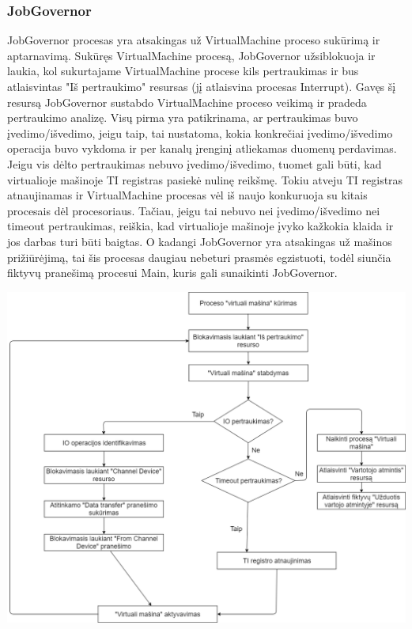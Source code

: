 \documentclass{scrartcl}
\begin{document}
      \subsubsection{JobGovernor}
        JobGovernor procesas yra atsakingas už VirtualMachine proceso sukūrimą ir aptarnavimą. Sukūręs VirtualMachine procesą, JobGovernor užsiblokuoja ir laukia, kol sukurtajame VirtualMachine procese kils pertraukimas ir bus atlaisvintas "Iš pertraukimo" resursas (jį atlaisvina procesas Interrupt). Gavęs šį resursą JobGovernor sustabdo VirtualMachine proceso veikimą ir pradeda pertraukimo analizę. Visų pirma yra patikrinama, ar pertraukimas buvo įvedimo/išvedimo, jeigu taip, tai nustatoma, kokia konkrečiai įvedimo/išvedimo operacija buvo vykdoma ir per kanalų įrenginį atliekamas duomenų perdavimas. Jeigu vis dėlto pertraukimas nebuvo įvedimo/išvedimo, tuomet gali būti, kad virtualioje mašinoje TI registras pasiekė nulinę reikšmę. Tokiu atveju TI registras atnaujinamas ir VirtualMachine procesas vėl iš naujo konkuruoja su kitais procesais dėl procesoriaus. Tačiau, jeigu tai nebuvo nei įvedimo/išvedimo nei timeout pertraukimas, reiškia, kad virtualioje mašinoje įvyko kažkokia klaida ir jos darbas turi būti baigtas. O kadangi JobGovernor yra atsakingas už mašinos prižiūrėjimą, tai šis procesas daugiau nebeturi prasmės egzistuoti, todėl siunčia fiktyvų pranešimą procesui Main, kuris gali sunaikinti JobGovernor.
        \begin{center}
          \includegraphics[width=\textwidth]{JobGovernor}
        \end{center}
\end{document}
